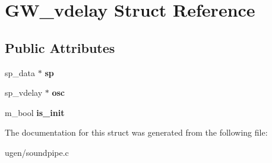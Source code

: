 \hypertarget{structGW__vdelay}{}\section{G\+W\+\_\+vdelay Struct Reference}
\label{structGW__vdelay}
\subsection*{Public Attributes}
\begin{DoxyCompactItemize}
\item 
\hypertarget{structGW__vdelay_ab82ef932f955d872e1fd6c689262592f}{}\label{structGW__vdelay_ab82ef932f955d872e1fd6c689262592f} 
sp\+\_\+data $\ast$ {\bfseries sp}
\item 
\hypertarget{structGW__vdelay_ac2b5355e6297777ac48b94886db98398}{}\label{structGW__vdelay_ac2b5355e6297777ac48b94886db98398} 
sp\+\_\+vdelay $\ast$ {\bfseries osc}
\item 
\hypertarget{structGW__vdelay_a64b3e23b5533f7e6b0d8dd97a2268e3e}{}\label{structGW__vdelay_a64b3e23b5533f7e6b0d8dd97a2268e3e} 
m\+\_\+bool {\bfseries is\+\_\+init}
\end{DoxyCompactItemize}


The documentation for this struct was generated from the following file\+:\begin{DoxyCompactItemize}
\item 
ugen/soundpipe.\+c\end{DoxyCompactItemize}
